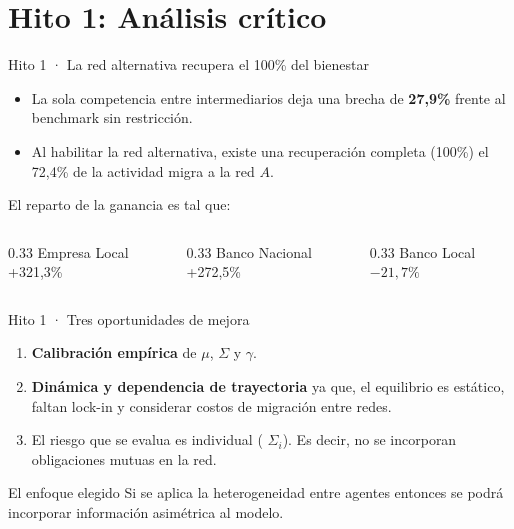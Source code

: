 \documentclass[xcolor=dvipsnames]{beamer}
\begin{document}
\section{Hito 1: Análisis crítico}
\begin{frame}{Hito 1 · La red alternativa recupera el 100\% del bienestar}
\begin{itemize}
  \item La sola competencia entre intermediarios deja una brecha de
        \textbf{27,9\%} frente al benchmark sin restricción.
  \item Al habilitar la red alternativa, existe una recuperación completa (100\%) el 72,4\% de la actividad migra a la red $A$.
\end{itemize}
\vfill
\begin{block}{El reparto de la ganancia es tal que:}
  \begin{columns}[c]
    \begin{column}{0.33\textwidth}\centering
      Empresa Local\\ {\DMSansBold\large +321,3\%}
    \end{column}
    \begin{column}{0.33\textwidth}\centering
      Banco Nacional\\ {\DMSansBold\large +272,5\%}
    \end{column}
    \begin{column}{0.33\textwidth}\centering
      Banco Local\\ {\DMSansBold\large $-21,7\%$}
    \end{column}
  \end{columns}
\end{block}

\end{frame}


\begin{frame}{Hito 1 · Tres oportunidades de mejora}
\begin{enumerate}
  \item \textbf{Calibración empírica} de $\mu$, $\Sigma$ y $\gamma$.
  \item \textbf{Dinámica y dependencia de trayectoria} ya que, el equilibrio es
        estático, faltan lock-in y considerar costos de migración entre redes.
  \item El riesgo que se evalua es individual (
        $\Sigma_i$). Es decir, no se incorporan obligaciones mutuas en la red.
\end{enumerate}
\vfill
\begin{block}{El enfoque elegido}
  Si se aplica la heterogeneidad entre agentes entonces se podrá incorporar información asimétrica al modelo.
\end{block}
\end{frame}
\end{document}
